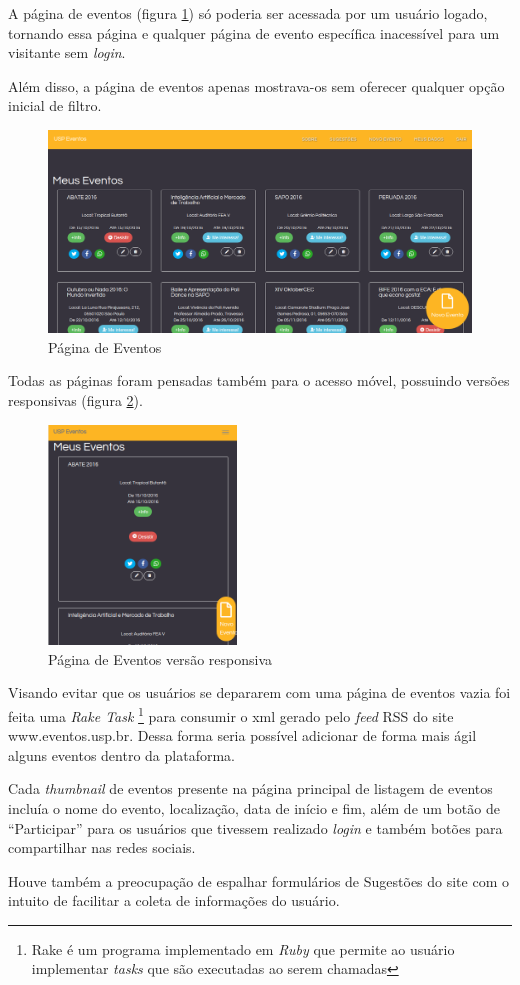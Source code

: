 		\par A página de eventos (figura \ref{fig:events_pagev1}) só poderia ser acessada por um usuário logado, tornando essa página e qualquer página de evento específica inacessível para um visitante sem \emph{login}.
		\par Além disso, a página de eventos apenas mostrava-os sem oferecer qualquer opção inicial de filtro.
        \begin{figure}[htb]
        \centering
		\includegraphics[width=15cm]{figuras/events_pagev1}
		\caption{\label{fig:events_pagev1} Página de Eventos}
		\end{figure}
\par Todas as páginas foram pensadas também para o acesso móvel, possuindo versões responsivas (figura \ref{fig:events_pagev1_responsive}).
        \begin{figure}[htb]
        \centering
		\includegraphics[width=5cm]{figuras/events_pagev1_responsive}
		\caption{\label{fig:events_pagev1_responsive} Página de Eventos versão responsiva}
		\end{figure}
\par Visando evitar que os usuários se depararem com uma página de eventos vazia foi feita uma \emph{Rake Task} \footnote{Rake é um programa implementado em \emph{Ruby} que permite ao usuário implementar \emph{tasks} que são executadas ao serem chamadas} para consumir o xml gerado pelo \emph{feed} RSS do site www.eventos.usp.br. Dessa forma seria possível adicionar de forma mais ágil alguns eventos dentro da plataforma.
\par Cada \emph{thumbnail} de eventos presente na página principal de listagem de eventos incluía o nome do evento, localização, data de início e fim, além de um botão de ``Participar'' para os usuários que tivessem realizado \emph{login} e também botões para compartilhar nas redes sociais.
\par Houve também a preocupação de espalhar formulários de Sugestões do site com o intuito de facilitar a coleta de informações do usuário.
